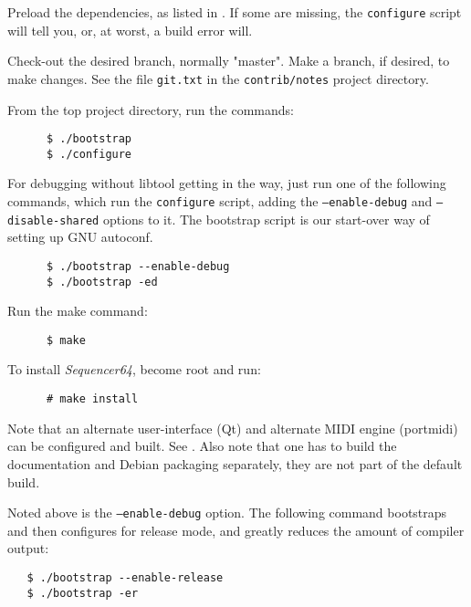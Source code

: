    \begin{enumber}
      \item Preload the dependencies, as listed in
         .
          If some are missing, the
          \texttt{configure} script will tell you,
          or, at worst, a build error will.
      \item Check-out the desired branch, normally "master".
         Make a branch, if desired, to make changes.
         See the file \texttt{git.txt} in the
         \texttt{contrib/notes} project directory.
      \item From the top project directory, run the commands:
\begin{verbatim}
      $ ./bootstrap
      $ ./configure
\end{verbatim}
      \item For debugging without libtool getting in the way, just run
         one of the following commands, which run the
         \texttt{configure} script, adding the
         \texttt{--enable-debug} and
         \texttt{--disable-shared} options to it.
         The bootstrap script is our start-over
         way of setting up GNU autoconf.
\begin{verbatim}
      $ ./bootstrap --enable-debug
      $ ./bootstrap -ed
\end{verbatim}
      \item Run the make command:
\begin{verbatim}
      $ make
\end{verbatim}
      \item To install \textsl{Sequencer64}, become root and run:
\begin{verbatim}
      # make install
\end{verbatim}
   \end{enumber}

   Note that an alternate user-interface (Qt) and alternate MIDI engine
   (portmidi) can be configured and built.
   See .
   Also note that one has to build the documentation and Debian packaging
   separately, they are not part of the default build.

   Noted above is the \texttt{--enable-debug} option.
   The following command bootstraps and then configures
   for release mode, and greatly reduces the amount of compiler output:
 
\begin{verbatim}
   $ ./bootstrap --enable-release
   $ ./bootstrap -er
\end{verbatim}

